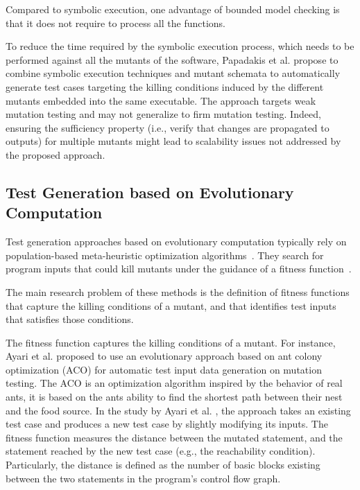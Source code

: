 
Compared to symbolic execution, one advantage of bounded model checking is that it does not require to process all the functions.

To reduce the time required by the symbolic execution process, which needs to be performed against all the mutants of the software, Papadakis et al. \cite{papadakis2011automatically, papadakis2010towards} propose to combine symbolic execution techniques and mutant schemata to automatically generate test cases targeting the killing conditions induced by the different mutants embedded into the same executable. The approach targets weak mutation testing and may not generalize to firm mutation testing. Indeed, ensuring the sufficiency property (i.e., verify that changes are propagated to outputs) for multiple mutants might lead to scalability issues not addressed by the proposed approach.

\subsection{Test Generation based on Evolutionary Computation}

Test generation approaches based on evolutionary computation typically rely on population-based meta-heuristic optimization algorithms~\cite{harman2011strong}. 
They search for program inputs that could kill mutants under the guidance of a fitness function~\cite{harman2011strong}. 

The main research problem of these methods is the definition of fitness functions that capture the killing conditions of a mutant, and that identifies test inputs that satisfies those conditions.

The fitness function captures the killing conditions of a mutant. For instance, Ayari et al. \cite{ayari2007automatic} proposed to use an evolutionary approach based on ant colony optimization (ACO) for automatic test input data generation on mutation testing. The ACO is an optimization algorithm inspired by the behavior of real ants, it is based on the ants ability to find the shortest path between their nest and the food source. In the study by Ayari et al. \cite{ayari2007automatic}, the approach takes an existing test case and produces a new test case by slightly modifying its inputs. 
The fitness function measures the distance between the mutated statement, and the statement reached by the new test case (e.g., the reachability condition). Particularly, the distance is defined as the number of basic blocks existing between the two statements in the program's control flow graph.

